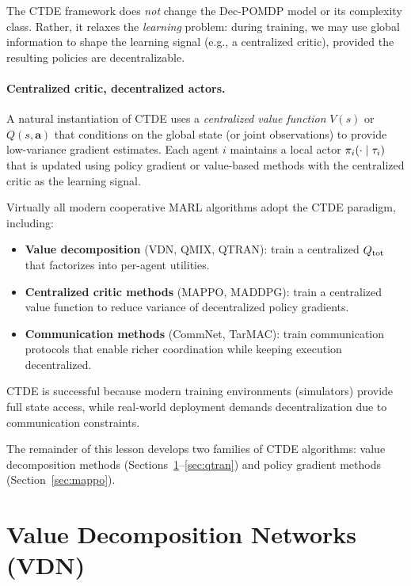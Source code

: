 \documentclass[11pt,a4paper]{article}
\begin{document}
The CTDE framework does \emph{not} change the Dec-POMDP model or
its complexity class.  Rather, it relaxes the \emph{learning}
problem: during training, we may use global information to shape
the learning signal (e.g., a centralized critic), provided the
resulting policies are decentralizable.

\paragraph{Centralized critic, decentralized actors.}
A natural instantiation of CTDE uses a \emph{centralized value
function} $V(s)$ or $Q(s, \mathbf{a})$ that conditions on the
global state (or joint observations) to provide low-variance
gradient estimates.  Each agent $i$ maintains a local actor
$\pi_i(\cdot \mid \tau_i)$ that is updated using policy
gradient or value-based methods with the centralized critic
as the learning signal.

\begin{rlconnection}[title={CTDE as the Dominant Paradigm}]
Virtually all modern cooperative MARL algorithms adopt the CTDE
paradigm, including:
\begin{itemize}[nosep]
  \item \textbf{Value decomposition} (VDN, QMIX, QTRAN): train a
    centralized $Q_{\mathrm{tot}}$ that factorizes into per-agent utilities.
  \item \textbf{Centralized critic methods} (MAPPO, MADDPG): train
    a centralized value function to reduce variance of decentralized
    policy gradients.
  \item \textbf{Communication methods} (CommNet, TarMAC): train
    communication protocols that enable richer coordination while
    keeping execution decentralized.
\end{itemize}
CTDE is successful because modern training environments (simulators)
provide full state access, while real-world deployment demands
decentralization due to communication constraints.
\end{rlconnection}

The remainder of this lesson develops two families of CTDE
algorithms: value decomposition methods (Sections~\ref{sec:vdn}--\ref{sec:qtran})
and policy gradient methods (Section~\ref{sec:mappo}).

\section{Value Decomposition Networks (VDN)}
\label{sec:vdn}
\end{document}
